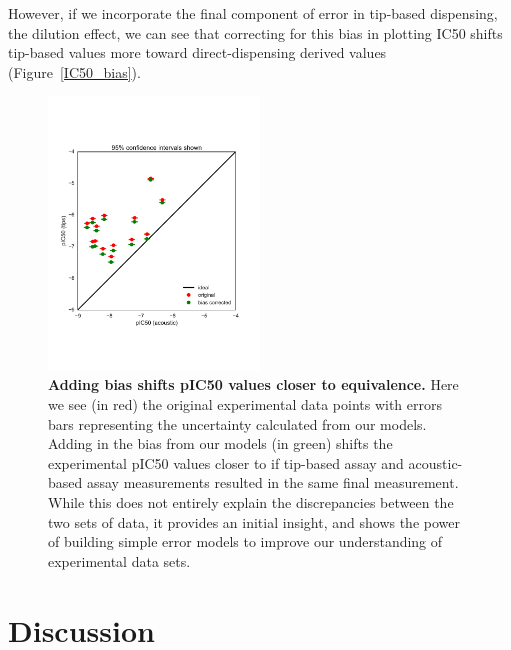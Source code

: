 \documentclass[aps,pre,twocolumn,nofootinbib,superscriptaddress,linenumbers]{revtex4-1}
\begin{document}
However, if we incorporate the final component of error in tip-based dispensing, the dilution effect, we can see that correcting for this bias in plotting IC50 shifts tip-based values more toward direct-dispensing derived values (Figure~\ref{IC50_bias}).

\begin{figure}[tb]
    \includegraphics[trim={0 4cm 0 4cm},clip,width=0.5\textwidth]{../figures/compare-pIC50-bias_corrected.pdf}

  \caption{{\bf Adding bias shifts pIC50 values closer to equivalence.}
  Here we see (in red) the original experimental data points with errors bars representing the uncertainty calculated from our models. Adding in the bias from our models (in green) shifts the experimental pIC50 values closer to if tip-based assay and acoustic-based assay measurements resulted in the same final measurement. While this does not entirely explain the discrepancies between the two sets of data, it provides an initial insight, and shows the power of building simple error models to improve our understanding of experimental data sets.
  }
  \label{fig:IC50_bias}
\end{figure}

\section{Discussion}
\end{document}
